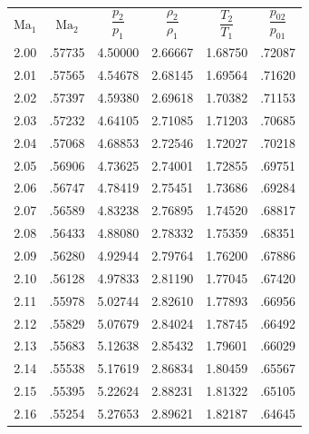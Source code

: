 \section*{}
\\ \vspace{4mm}%
\begin{minipage}{0.47\textwidth}
    \centering
    \begin{tabular}{c|c|c|c|c|c}
        $\text{Ma}_1$ & $\text{Ma}_2$ & $\dfrac{p_2}{p_1}$ & $\dfrac{\rho_2}{\rho_1}$ & $\dfrac{T_2}{T_1}$ & $\dfrac{p_{02}}{p_{01}}$ \\[2.2ex] \arrayrulecolor{Blue}\hline\arrayrulecolor{black}
        2.00 & .57735 & 4.50000 & 2.66667 & 1.68750 & .72087 \\
        2.01 & .57565 & 4.54678 & 2.68145 & 1.69564 & .71620 \\ \arrayrulecolor{Red}\hline\arrayrulecolor{black}
        2.02 & .57397 & 4.59380 & 2.69618 & 1.70382 & .71153 \\
        2.03 & .57232 & 4.64105 & 2.71085 & 1.71203 & .70685 \\
        2.04 & .57068 & 4.68853 & 2.72546 & 1.72027 & .70218 \\
        2.05 & .56906 & 4.73625 & 2.74001 & 1.72855 & .69751 \\
        2.06 & .56747 & 4.78419 & 2.75451 & 1.73686 & .69284 \\
        2.07 & .56589 & 4.83238 & 2.76895 & 1.74520 & .68817 \\
        2.08 & .56433 & 4.88080 & 2.78332 & 1.75359 & .68351 \\
        2.09 & .56280 & 4.92944 & 2.79764 & 1.76200 & .67886 \\
        2.10 & .56128 & 4.97833 & 2.81190 & 1.77045 & .67420 \\
        2.11 & .55978 & 5.02744 & 2.82610 & 1.77893 & .66956 \\
        2.12 & .55829 & 5.07679 & 2.84024 & 1.78745 & .66492 \\
        2.13 & .55683 & 5.12638 & 2.85432 & 1.79601 & .66029 \\
        2.14 & .55538 & 5.17619 & 2.86834 & 1.80459 & .65567 \\
        2.15 & .55395 & 5.22624 & 2.88231 & 1.81322 & .65105 \\
        2.16 & .55254 & 5.27653 & 2.89621 & 1.82187 & .64645 \\

\end{tabular}
\end{minipage}
